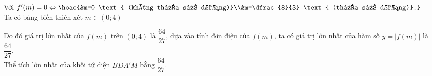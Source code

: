 \begin{ex}
{		Với $f'(m)=0\Leftrightarrow \hoac{&m=0 \text{ (không  thỏa số dương)}\\&m=\dfrac{8}{3} \text{ (thỏa số dương)}.}$\\
		 Ta có bảng biến thiên xét $m\in(0;4)$
		\begin{center}
		\end{center}
		Do đó giá trị lớn nhất của $f(m)$ trên $(0;4)$ là $\dfrac{64}{27}$, dựa vào tính đơn điệu của $f(m)$, ta có  giá trị lớn nhất của hàm số $y=|f(m)|$ là $\dfrac{64}{27}$.\\
		Thể tích lớn nhất của  khối tứ diện $BDA'M$ bằng $\dfrac{64}{27}$.
	} 
\end{ex}

